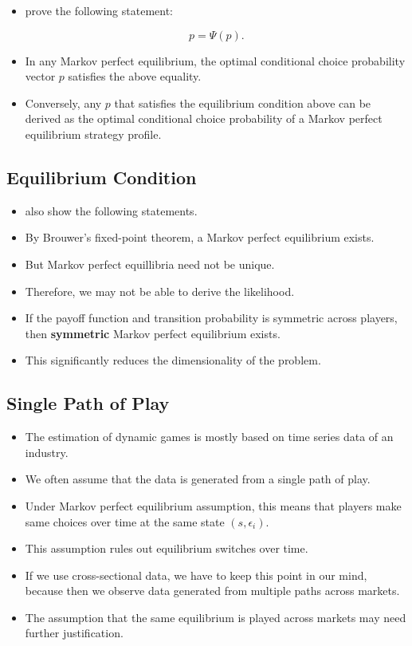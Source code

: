\documentclass[]{book}
\providecommand{\tightlist}{%
  \setlength{\itemsep}{0pt}\setlength{\parskip}{0pt}}
\begin{document}
\begin{itemize}
\tightlist
\item
  \citet{pesendorferAsymptoticLeastSquares2008} prove the following
  statement:

  \begin{equation}
  p = \Psi(p).
  \end{equation}
\item
  In any Markov perfect equilibrium, the optimal conditional choice
  probability vector \(p\) satisfies the above equality.
\item
  Conversely, any \(p\) that satisfies the equilibrium condition above
  can be derived as the optimal conditional choice probability of a
  Markov perfect equilibrium strategy profile.
\end{itemize}

\subsection{Equilibrium Condition}\label{equilibrium-condition-2}

\begin{itemize}
\tightlist
\item
  \citet{pesendorferAsymptoticLeastSquares2008} also show the following
  statements.
\item
  By Brouwer's fixed-point theorem, a Markov perfect equilibrium exists.
\item
  But Markov perfect equillibria need not be unique.
\item
  Therefore, we may not be able to derive the likelihood.
\item
  If the payoff function and transition probability is symmetric across
  players, then \textbf{symmetric} Markov perfect equilibrium exists.
\item
  This significantly reduces the dimensionality of the problem.
\end{itemize}

\subsection{Single Path of Play}\label{single-path-of-play}

\begin{itemize}
\tightlist
\item
  The estimation of dynamic games is mostly based on time series data of
  an industry.
\item
  We often assume that the data is generated from a single path of play.
\item
  Under Markov perfect equilibrium assumption, this means that players
  make same choices over time at the same state \((s, \epsilon_i)\).
\item
  This assumption rules out equilibrium switches over time.
\item
  If we use cross-sectional data, we have to keep this point in our
  mind, because then we observe data generated from multiple paths
  across markets.
\item
  The assumption that the same equilibrium is played across markets may
  need further justification.
\end{itemize}
\end{document}
